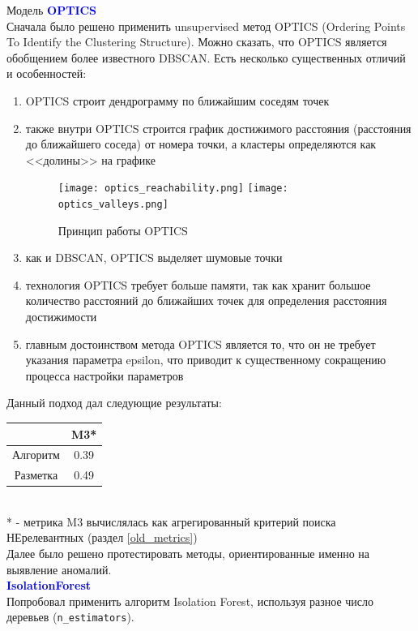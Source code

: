 \documentclass{article}
\begin{document}
\begin{section}{Модель}
\textbf{\textcolor{blue}{OPTICS}}\\
Сначала было решено применить unsupervised метод OPTICS (Ordering Points To Identify the Clustering Structure). Можно сказать, что OPTICS является обобщением более известного DBSCAN. Есть несколько существенных отличий и особенностей:
\begin{enumerate}
    \item OPTICS строит дендрограмму по ближайшим соседям точек
    \item также внутри OPTICS строится график достижимого расстояния (расстояния до ближайшего соседа) от номера точки, а кластеры определяются как <<долины>> на графике
    \begin{figure}[!htb]
    \center
        \texttt{[image: optics\_reachability.png]}
        \texttt{[image: optics\_valleys.png]}
        \caption{Принцип работы OPTICS}
    \end{figure}
    \item как и DBSCAN, OPTICS выделяет шумовые точки
    \item технология OPTICS требует больше памяти, так как хранит большое количество расстояний до ближайших точек для определения расстояния достижимости
    \item главным достоинством метода OPTICS является то, что он не требует указания параметра epsilon, что приводит к существенному сокращению процесса настройки параметров
\end{enumerate}

Данный подход дал следующие результаты:
\begin{table}[!htb]
    \center
    \begin{tabular}{|c|c|}
    \hline
             & M3*   \\ \hline
    Алгоритм & 0.39 \\ \hline
    Разметка & 0.49 \\ \hline
    \end{tabular}
\end{table}\\
* - метрика M3 вычислялась как агрегированный критерий поиска НЕрелевантных (раздел \textcolor{cyan}{\ref{old_metrics}})\\

Далее было решено протестировать методы, ориентированные именно на выявление аномалий.\\

\textbf{\textcolor{blue}{IsolationForest}}\label{isolationforest}\\
Попробовал применить алгоритм Isolation Forest, используя разное число деревьев (\verb|n_estimators|).\\


\end{section}
\end{document}
